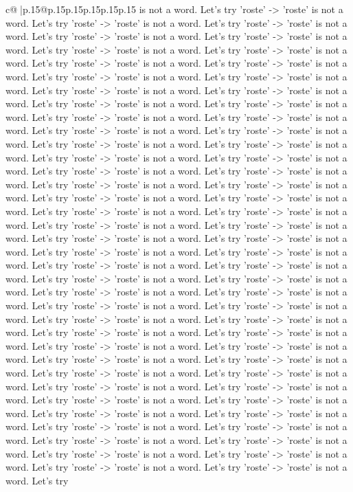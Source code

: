 \documentclass{article}
\begin{document}
{\begin{supertabular}{c@{$\;$}|p{.15\linewidth}@{}p{.15\linewidth}p{.15\linewidth}p{.15\linewidth}p{.15\linewidth}p{.15\linewidth}}
{{{is not a word. Let's try 'roste' {-}> 'roste' is not a word. Let's try 'roste' {-}> 'roste' is not a word. Let's try 'roste' {-}> 'roste' is not a word. Let's try 'roste' {-}> 'roste' is not a word. Let's try 'roste' {-}> 'roste' is not a word. Let's try 'roste' {-}> 'roste' is not a word. Let's try 'roste' {-}> 'roste' is not a word. Let's try 'roste' {-}> 'roste' is not a word. Let's try 'roste' {-}> 'roste' is not a word. Let's try 'roste' {-}> 'roste' is not a word. Let's try 'roste' {-}> 'roste' is not a word. Let's try 'roste' {-}> 'roste' is not a word. Let's try 'roste' {-}> 'roste' is not a word. Let's try 'roste' {-}> 'roste' is not a word. Let's try 'roste' {-}> 'roste' is not a word. Let's try 'roste' {-}> 'roste' is not a word. Let's try 'roste' {-}> 'roste' is not a word. Let's try 'roste' {-}> 'roste' is not a word. Let's try 'roste' {-}> 'roste' is not a word. Let's try 'roste' {-}> 'roste' is not a word. Let's try 'roste' {-}> 'roste' is not a word. Let's try 'roste' {-}> 'roste' is not a word. Let's try 'roste' {-}> 'roste' is not a word. Let's try 'roste' {-}> 'roste' is not a word. Let's try 'roste' {-}> 'roste' is not a word. Let's try 'roste' {-}> 'roste' is not a word. Let's try 'roste' {-}> 'roste' is not a word. Let's try 'roste' {-}> 'roste' is not a word. Let's try 'roste' {-}> 'roste' is not a word. Let's try 'roste' {-}> 'roste' is not a word. Let's try 'roste' {-}> 'roste' is not a word. Let's try 'roste' {-}> 'roste' is not a word. Let's try 'roste' {-}> 'roste' is not a word. Let's try 'roste' {-}> 'roste' is not a word. Let's try 'roste' {-}> 'roste' is not a word. Let's try 'roste' {-}> 'roste' is not a word. Let's try 'roste' {-}> 'roste' is not a word. Let's try 'roste' {-}> 'roste' is not a word. Let's try 'roste' {-}> 'roste' is not a word. Let's try 'roste' {-}> 'roste' is not a word. Let's try 'roste' {-}> 'roste' is not a word. Let's try 'roste' {-}> 'roste' is not a word. Let's try 'roste' {-}> 'roste' is not a word. Let's try 'roste' {-}> 'roste' is not a word. Let's try 'roste' {-}> 'roste' is not a word. Let's try 'roste' {-}> 'roste' is not a word. Let's try 'roste' {-}> 'roste' is not a word. Let's try 'roste' {-}> 'roste' is not a word. Let's try 'roste' {-}> 'roste' is not a word. Let's try 'roste' {-}> 'roste' is not a word. Let's try 'roste' {-}> 'roste' is not a word. Let's try 'roste' {-}> 'roste' is not a word. Let's try 'roste' {-}> 'roste' is not a word. Let's try 'roste' {-}> 'roste' is not a word. Let's try 'roste' {-}> 'roste' is not a word. Let's try 'roste' {-}> 'roste' is not a word. Let's try 'roste' {-}> 'roste' is not a word. Let's try 'roste' {-}> 'roste' is not a word. Let's try 'roste' {-}> 'roste' is not a word. Let's try 'roste' {-}> 'roste' is not a word. Let's try 'roste' {-}> 'roste' is not a word. Let's try 'roste' {-}> 'roste' is not a word. Let's try 'roste' {-}> 'roste' is not a word. Let's try 'roste' {-}> 'roste' is not a word. Let's try 'roste' {-}> 'roste' is not a word. Let's try 'roste' {-}> 'roste' is not a word. Let's try 'roste' {-}> 'roste' is not a word. Let's try 'roste' {-}> 'roste' is not a word. Let's try 'roste' {-}> 'roste' is not a word. Let's try }}}
\end{supertabular}}
\end{document}
